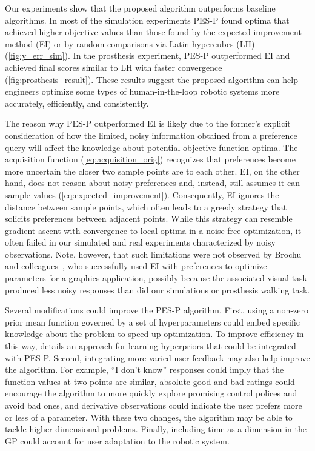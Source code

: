 Our experiments show that the proposed algorithm outperforms baseline
algorithms. In most of the simulation experiments PES-P found optima that
achieved higher objective values than those found by the expected improvement
method (EI) or by random comparisons via Latin hypercubes (LH)
(\cref{fig:y_err_sim}). In the prosthesis experiment, PES-P outperformed EI and
achieved final scores similar to LH with faster convergence
(\cref{fig:prosthesis_result}). These results suggest the proposed algorithm can
help engineers optimize some types of human-in-the-loop robotic systems more
accurately, efficiently, and consistently. 

The reason why PES-P outperformed EI is likely due to the former's explicit
consideration of how the limited, noisy information obtained from a preference
query will affect the knowledge about potential objective function optima. The
acquisition function (\cref{eq:acquisition_orig}) recognizes that preferences
become more uncertain the closer two sample points are to each other. EI, on the
other hand, does not reason about noisy preferences and, instead, still assumes
it can sample values (\cref{eq:expected_improvement}). Consequently, EI ignores
the distance between sample points, which often leads to a greedy strategy that
solicits preferences between adjacent points. While this strategy can resemble
gradient ascent with convergence to local optima in a noise-free optimization,
it often failed in our simulated and real experiments characterized by noisy
observations. Note, however, that such limitations were not observed by Brochu
and colleagues~\citep{eric2008active}, who successfully used EI with preferences
to optimize parameters for a graphics application, possibly because the
associated visual task produced less noisy responses than did our simulations or
prosthesis walking task. 

Several modifications could improve the PES-P algorithm. First, using a non-zero
prior mean function governed by a set of hyperparameters could embed specific
knowledge about the problem to speed up optimization. To improve efficiency in
this way, \citep{brochu2010bayesian} details an approach for learning hyperpriors
that could be integrated with PES-P.  Second, integrating more varied user
feedback may also help improve the algorithm. For example, ``I don't know''
responses could imply that the function values at two points are similar,
absolute good and bad ratings could encourage the algorithm to more quickly
explore promising control polices and avoid bad ones, and derivative
observations could indicate the user prefers more or less of a parameter. With
these two changes, the algorithm may be able to tackle higher dimensional
problems.  Finally, including time as a dimension in the GP could account for
user adaptation to the robotic system.

